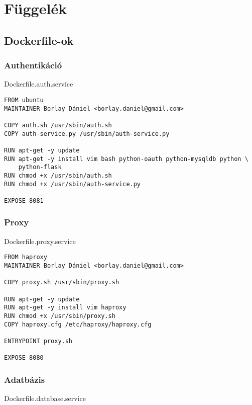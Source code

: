 \appendix

\chapter{Függelék}\label{fuxfcggeluxe9k}

\section{Dockerfile-ok}\label{dockerfile-ok}

\subsection{Authentikáció}\label{authentikuxe1ciuxf3}

Dockerfile.auth.service

\begin{verbatim}
FROM ubuntu
MAINTAINER Borlay Dániel <borlay.daniel@gmail.com>

COPY auth.sh /usr/sbin/auth.sh
COPY auth-service.py /usr/sbin/auth-service.py

RUN apt-get -y update
RUN apt-get -y install vim bash python-oauth python-mysqldb python \
    python-flask
RUN chmod +x /usr/sbin/auth.sh
RUN chmod +x /usr/sbin/auth-service.py

EXPOSE 8081
\end{verbatim}

\subsection{Proxy}\label{proxy}

Dockerfile.proxy.service

\begin{verbatim}
FROM haproxy
MAINTAINER Borlay Dániel <borlay.daniel@gmail.com>

COPY proxy.sh /usr/sbin/proxy.sh

RUN apt-get -y update
RUN apt-get -y install vim haproxy
RUN chmod +x /usr/sbin/proxy.sh
COPY haproxy.cfg /etc/haproxy/haproxy.cfg

ENTRYPOINT proxy.sh

EXPOSE 8080
\end{verbatim}

\subsection{Adatbázis}\label{adatbuxe1zis}

Dockerfile.database.service

